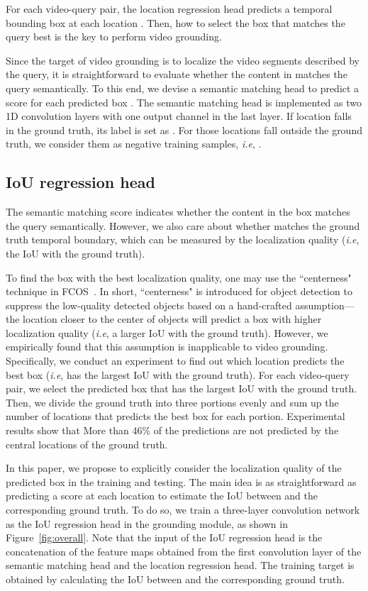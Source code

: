 \documentclass[10pt,twocolumn,letterpaper]{article}
\def\ie{\emph{i.e}\onedot} \def\Ie{\emph{I.e}\onedot}
\begin{document}
	For each video-query pair, the location regression head predicts a temporal bounding box  at each location . Then, how to select the box that matches the query best is the key to perform video grounding.
	
	Since the target of video grounding is to localize the video segments described by the query, it is straightforward to evaluate whether the content in  matches the query semantically.
	To this end, we devise a semantic matching head to predict a score  for each predicted box .
	The semantic matching head is implemented as two 1D convolution layers with one output channel in the last layer. 
	If location  falls in the ground truth, its label is set as .
	For those locations fall outside the ground truth, we consider them as negative training samples, \ie, . 
	
	


	\subsection{IoU regression head}
	\label{sec:iou-head}
	
	The semantic matching score  indicates whether the content in the box  matches the query semantically. However, we also care about whether  matches the ground truth temporal boundary, which can be measured by the localization quality (\ie, the IoU with the ground truth).
	
	To find the box with the best localization quality, one may use the ``centerness" technique in FCOS~\cite{tian2019fcos}. In short, ``centerness" is introduced for object detection to suppress the low-quality detected objects based on a hand-crafted assumption---the location closer to the center of objects will predict a box with higher localization quality (\ie, a larger IoU with the ground truth). However, we empirically found that this assumption is inapplicable to video grounding. Specifically, we conduct an experiment to find out which location predicts the best box (\ie, has the largest IoU with the ground truth).
	For each video-query pair, we select the predicted box that has the largest IoU with the ground truth.
Then, we divide the ground truth into three portions evenly and sum up the number of locations that predicts the best box for each portion.
Experimental results show that More than 46\% of the predictions are not predicted by the central locations of the ground truth.
	
	
	
	In this paper, we propose to explicitly consider the localization quality of the predicted box  in the training and testing. The main idea is as straightforward as predicting a score at each location  to estimate the IoU between  and the corresponding ground truth. To do so, we train a three-layer convolution network as the IoU regression head in the grounding module, as shown in Figure~\ref{fig:overall}. Note that the input of the 
	IoU regression head is the concatenation of the feature maps obtained from the first convolution layer of the semantic matching head and the location regression head.
The training target  is obtained by calculating the IoU between  and the corresponding ground truth. 
	
\end{document}
